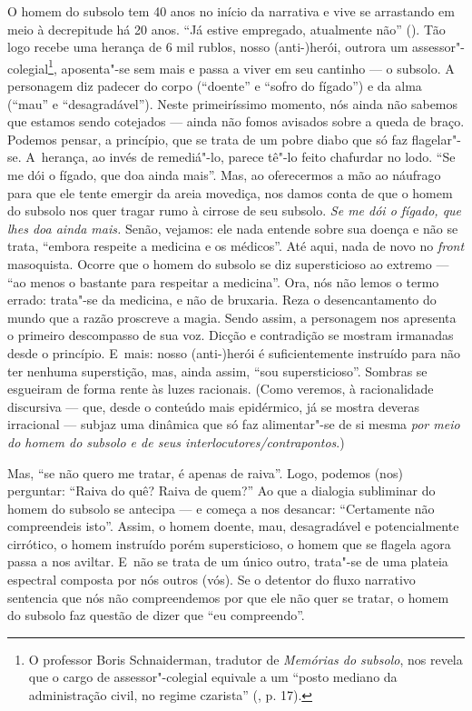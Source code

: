 O homem do subsolo tem 40 anos no início da narrativa e vive se
arrastando em meio à decrepitude há 20 anos. ``Já estive empregado,
atualmente não'' (). Tão logo recebe uma herança de 6 mil rublos,
nosso \mbox{(anti-)herói}, outrora um assessor"-colegial\footnote{O professor
  Boris Schnaiderman, tradutor de \emph{Memórias do subsolo}, nos revela
  que o cargo de assessor"-colegial equivale a um ``posto mediano da
  administração civil, no regime czarista'' (, p. 17).},
aposenta"-se sem mais e passa a viver em seu cantinho --- o subsolo. A
personagem diz padecer do corpo (``doente'' e ``sofro do fígado'') e da
alma (``mau'' e ``desagradável''). Neste primeiríssimo momento, nós
ainda não sabemos que estamos sendo cotejados --- ainda não fomos
avisados sobre a queda de braço. Podemos pensar, a princípio, que se
trata de um pobre diabo que só faz flagelar"-se. A~herança, ao invés de
remediá"-lo, parece tê"-lo feito chafurdar no lodo. ``Se me dói o fígado,
que doa ainda mais''. Mas, ao oferecermos a mão ao náufrago para que ele
tente emergir da areia movediça, nos damos conta de que o homem do
subsolo nos quer tragar rumo à cirrose de seu subsolo. \emph{Se me dói o
fígado, que lhes doa ainda mais.} Senão, vejamos: ele nada entende sobre
sua doença e não se trata, ``embora respeite a medicina e os médicos''.
Até aqui, nada de novo no \emph{front} masoquista. Ocorre que o homem do
subsolo se diz supersticioso ao extremo --- ``ao menos o bastante para
respeitar a medicina''. Ora, nós não lemos o termo errado: trata"-se da
medicina, e não de bruxaria. Reza o desencantamento do mundo que a razão
proscreve a magia. Sendo assim, a personagem nos apresenta o primeiro
descompasso de sua voz. Dicção e contradição se mostram irmanadas desde
o princípio. E~mais: nosso \mbox{(anti-)herói} é suficientemente instruído para
não ter nenhuma superstição, mas, ainda assim, ``sou supersticioso''.
Sombras se esgueiram de forma rente às luzes racionais. (Como veremos, à
racionalidade discursiva --- que, desde o conteúdo mais epidérmico, já se
mostra deveras irracional --- subjaz uma dinâmica que só faz alimentar"-se
de si mesma \emph{por meio do homem do subsolo e de seus
interlocutores/contrapontos}.)

Mas, ``se não quero me tratar, é apenas de raiva''. Logo, podemos (nos)
perguntar: ``Raiva do quê? Raiva de quem?'' Ao que a dialogia subliminar
do homem do subsolo se antecipa --- e começa a nos desancar: ``Certamente
não compreendeis isto''. Assim, o homem doente, mau, desagradável e
potencialmente cirrótico, o homem instruído porém supersticioso, o homem
que se flagela agora passa a nos aviltar. E~não se trata de um único
outro, trata"-se de uma plateia espectral composta por nós outros (vós).
Se o detentor do fluxo narrativo sentencia que nós não compreendemos por
que ele não quer se tratar, o homem do subsolo faz questão de dizer que
``eu compreendo''.

